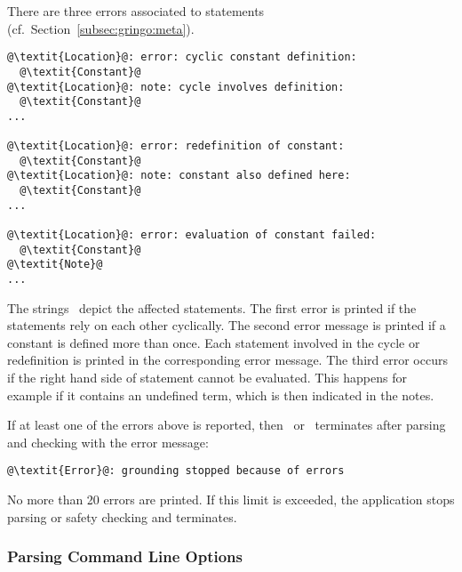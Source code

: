 There are three errors associated to  statements (cf.~Section~\ref{subsec:gringo:meta}).
\begin{lstlisting}[numbers=none,escapechar=@]
@\textit{Location}@: error: cyclic constant definition:
  @\textit{Constant}@
@\textit{Location}@: note: cycle involves definition:
  @\textit{Constant}@
...

@\textit{Location}@: error: redefinition of constant:
  @\textit{Constant}@
@\textit{Location}@: note: constant also defined here:
  @\textit{Constant}@
...

@\textit{Location}@: error: evaluation of constant failed:
  @\textit{Constant}@
@\textit{Note}@
...
\end{lstlisting}
The strings~ depict the affected  statements.
The first error is printed if the statements rely on each other cyclically.
The second error message is printed if a constant is defined more than once.
Each statement involved in the cycle or redefinition is printed in the corresponding error message.
The third error occurs if the right hand side of  statement cannot be evaluated.
This happens for example if it contains an undefined term, which is then indicated in the notes.

If at least one of the errors above is reported,
then \gringo\ or \clingo\ terminates after parsing and checking with the error message:
\begin{lstlisting}[numbers=none,escapechar=@]
@\textit{Error}@: grounding stopped because of errors
\end{lstlisting}

\begin{note}
No more than 20 errors are printed.
If this limit is exceeded, the application stops parsing or safety checking and terminates.
\end{note}

\subsubsection{Parsing Command Line Options}\label{subsec:error:options}

